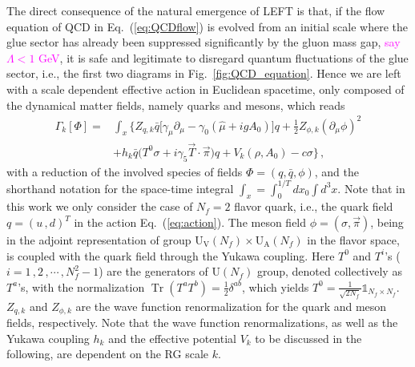 \documentclass[%
reprint,
superscriptaddress,
showpacs,preprintnumbers,
 amsmath,amssymb,
 aps,
prd,
]{revtex4-1}
\newcommand{\Tr}{\ensuremath{\operatorname{Tr}}}
\def\Fig#1{Fig.~\ref{#1}} \def\Tab#1{Tab.~\ref{#1}}
\def\Eq#1{Eq.~(\ref{#1})}
\newcommand{\colfab}[1]{\textcolor{magenta}{#1}}
\begin{document}
The direct consequence of the natural emergence of LEFT is that,  if the flow equation of QCD in \Eq{eq:QCDflow} is evolved from an initial scale where the glue sector has already been suppressed significantly by the gluon mass gap, \colfab{say $\Lambda < 1$ GeV}, it is safe and legitimate to disregard quantum fluctuations of the glue sector, i.e., the first two diagrams in \Fig{fig:QCD_equation}. Hence we are left with a scale dependent effective action in Euclidean spacetime, only composed of the dynamical matter fields, namely quarks and mesons, which reads
%
\begin{align}
\Gamma_k[\Phi]=&\int_x \bigg\{Z_{q,k}\bar{q} \Big [\gamma_\mu \partial_\mu -\gamma_0(\hat\mu+igA_0) \Big ]q+\frac{1}{2}Z_{\phi,k}(\partial_\mu \phi)^2 \nonumber\\[2ex]
&+h_k\bar{q}\big(T^0\sigma+i\gamma_5\vec{T}\cdot \vec{\pi}\big)q+V_k(\rho,A_0)-c\sigma \bigg\}\,,\label{eq:action}
\end{align}
%
with a reduction of the involved species of fields $\Phi=(q,\bar q,\phi)$, and the shorthand notation for the space-time integral $\int_{x}=\int_0^{1/T}d x_0 \int d^3 x$. Note that in this work we only consider the case of $N_f=2$ flavor quark, i.e., the quark field $q=(u\,,d)^{T}$ in the action \Eq{eq:action}. The meson field $\phi=\left(\sigma,\vec{\pi}\right)$, being in the adjoint representation of group $\mathrm{U_V}(N_f)\times\mathrm{U_A}(N_f)$ in the flavor space, is coupled with the quark field through the Yukawa coupling. Here $T^0$ and $T^{i}$'s ($i=1\,,2\,,\cdots\,,N_f^2-1$) are the generators of $\mathrm{U}(N_f)$ group, denoted collectively as $T^a$'s, with the normalization $\Tr(T^{a}T^{b})=\frac{1}{2}\delta^{ab}$, which yields $T^{0}=\frac{1}{\sqrt{2N_{f}}}\mathbb{1}_{N_{f}\times N_{f}}$. $Z_{q,k}$ and $Z_{\phi,k}$ are the wave function renormalization for the quark and meson fields, respectively. Note that the wave function renormalizations, as well as the Yukawa coupling $h_k$ and the effective potential $V_k$ to be discussed in the following, are dependent on the RG scale $k$. 
\end{document}
